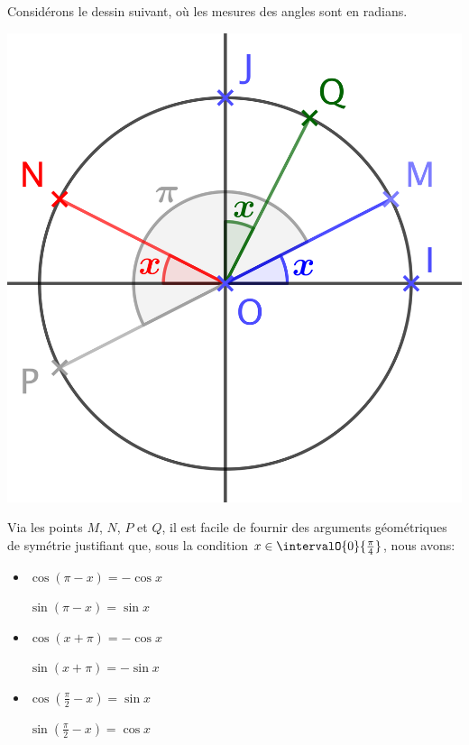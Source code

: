 Considérons le dessin suivant, où les mesures des angles sont en radians.

\begin{center}
	\includegraphics[scale = .7]{one-var-trig-formulas.png}
\end{center}

Via les points $M$, $N$, $P$ et $Q$, il est facile de fournir des arguments géométriques de symétrie justifiant que, sous la condition $x \in \intervalO{0}{\frac{\pi}{4}}$, nous avons:
%
\begin{multicols}{3}
\begin{itemize}[label=\small\textbullet]
	\item $\cos (\pi - x) = - \cos x$

	      \noindent
	      $\sin (\pi - x) = \sin x$ 

	\item $\cos (x + \pi) = - \cos x$

	      \noindent
	      $\sin (x + \pi) = - \sin x$

	\item $\cos \left( \frac{\pi}{2} - x \right) = \sin x$

	      \noindent
	      $\sin \left( \frac{\pi}{2} - x \right) = \cos x$ 
\end{itemize}
\end{multicols}


